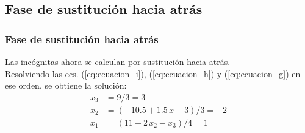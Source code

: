 \subsection{Fase de sustitución hacia atrás}
\begin{frame}
\frametitle{Fase de sustitución hacia atrás}
Las incógnitas ahora se calculan por sustitución hacia atrás.
\\
\bigskip
\pause
Resolviendo las ecs. (\ref{eq:ecuacion_i}), (\ref{eq:ecuacion_h}) y (\ref{eq:ecuacion_g}) en ese orden, se obtiene la solución:
\begin{align*}
x_{3} &= 9/3 = 3 \\
x_{2} &= (-10.5 + 1.5 \, x-{3})/3 = -2 \\
x_{1} &= (11 + 2 \, x_{2} - x_{3})/4 = 1
\end{align*}
\end{frame}
